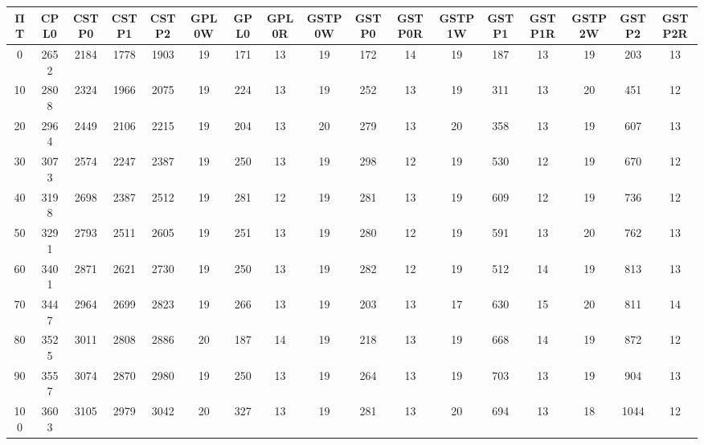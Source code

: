 \begin{tabular}{|c|c|c|c|c|c|c|c|c|c|c|c|c|c|c|c|c|}
\hline
ΠΤ&CPL0&CSTP0&CSTP1&CSTP2&GPL0W&GPL0&GPL0R&GSTP0W&GSTP0&GSTP0R&GSTP1W&GSTP1&GSTP1R&GSTP2W&GSTP2&GSTP2R\\
\hline
\hline
0&2652&2184&1778&1903&19&171&13&19&172&14&19&187&13&19&203&13\\
\hline
10&2808&2324&1966&2075&19&224&13&19&252&13&19&311&13&20&451&12\\
\hline
20&2964&2449&2106&2215&19&204&13&20&279&13&20&358&13&19&607&13\\
\hline
30&3073&2574&2247&2387&19&250&13&19&298&12&19&530&12&19&670&12\\
\hline
40&3198&2698&2387&2512&19&281&12&19&281&13&19&609&12&19&736&12\\
\hline
50&3291&2793&2511&2605&19&251&13&19&280&12&19&591&13&20&762&13\\
\hline
60&3401&2871&2621&2730&19&250&13&19&282&12&19&512&14&19&813&13\\
\hline
70&3447&2964&2699&2823&19&266&13&19&203&13&17&630&15&20&811&14\\
\hline
80&3525&3011&2808&2886&20&187&14&19&218&13&19&668&14&19&872&12\\
\hline
90&3557&3074&2870&2980&19&250&13&19&264&13&19&703&13&19&904&13\\
\hline
100&3603&3105&2979&3042&20&327&13&19&281&13&20&694&13&18&1044&12\\
\hline
\end{tabular}
